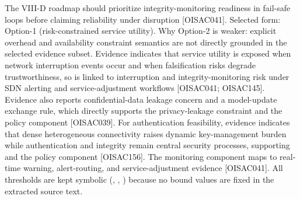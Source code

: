  The VIII-D roadmap should prioritize integrity-monitoring readiness in fail-safe loops before claiming reliability under disruption [O\markdownRendererUnderscore{}ISAC\markdownRendererUnderscore{}041].\markdownRendererOlItemEnd 
\markdownRendererOlEnd \markdownRendererInterblockSeparator
{}
\markdownRendererSectionEnd \markdownRendererSectionBegin
{}\markdownRendererInterblockSeparator
{}Selected form: Option-1 (risk-constrained service utility).\markdownRendererInterblockSeparator
{}\markdownRendererUlBeginTight
\markdownRendererUlItem Why Option-2 is weaker: explicit overhead and availability constraint semantics are not directly grounded in the selected evidence subset.\markdownRendererUlItemEnd 
\markdownRendererUlEndTight \markdownRendererInterblockSeparator
{}\markdownRendererParagraphSeparator
{}Evidence indicates that service utility is exposed when network interruption events occur and when falsification risks degrade trustworthiness, so  is linked to interruption and integrity-monitoring risk under SDN alerting and service-adjustment workflows [O\markdownRendererUnderscore{}ISAC\markdownRendererUnderscore{}041; O\markdownRendererUnderscore{}ISAC\markdownRendererUnderscore{}145]. Evidence also reports confidential-data leakage concern and a model-update exchange rule, which directly supports the privacy-leakage constraint  and the  policy component [O\markdownRendererUnderscore{}ISAC\markdownRendererUnderscore{}039]. For authentication feasibility, evidence indicates that dense heterogeneous connectivity raises dynamic key-management burden while authentication and integrity remain central security processes, supporting  and the  policy component [O\markdownRendererUnderscore{}ISAC\markdownRendererUnderscore{}156]. The monitoring component  maps to real-time warning, alert-routing, and service-adjustment evidence [O\markdownRendererUnderscore{}ISAC\markdownRendererUnderscore{}041]. All thresholds are kept symbolic (, , ) because no bound values are fixed in the extracted source text.\markdownRendererInterblockSeparator
